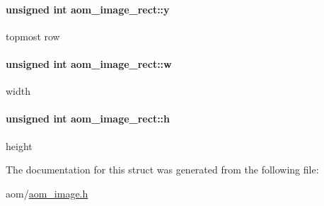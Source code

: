 \paragraph[{\texorpdfstring{y}{y}}]{\setlength{\rightskip}{0pt plus 5cm}unsigned int aom\+\_\+image\+\_\+rect\+::y}\hypertarget{structaom__image__rect_ad96b4a0053a7b2d145f709f903a13cff}{}\label{structaom__image__rect_ad96b4a0053a7b2d145f709f903a13cff}
topmost row 
\paragraph[{\texorpdfstring{w}{w}}]{\setlength{\rightskip}{0pt plus 5cm}unsigned int aom\+\_\+image\+\_\+rect\+::w}\hypertarget{structaom__image__rect_aed38fa7222f10a140eded2293da8df10}{}\label{structaom__image__rect_aed38fa7222f10a140eded2293da8df10}
width 
\paragraph[{\texorpdfstring{h}{h}}]{\setlength{\rightskip}{0pt plus 5cm}unsigned int aom\+\_\+image\+\_\+rect\+::h}\hypertarget{structaom__image__rect_aa018a037ad51dc1ed6e3208e66ba1ca3}{}\label{structaom__image__rect_aa018a037ad51dc1ed6e3208e66ba1ca3}
height 

The documentation for this struct was generated from the following file\+:\begin{DoxyCompactItemize}
\item 
aom/\hyperlink{aom__image_8h}{aom\+\_\+image.\+h}\end{DoxyCompactItemize}
